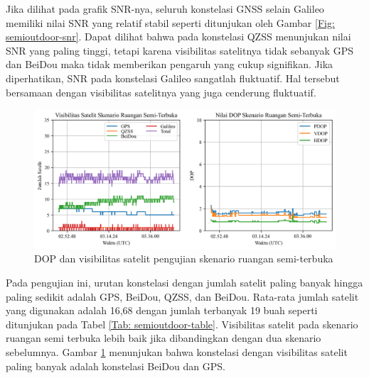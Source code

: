 Jika dilihat pada grafik SNR-nya, seluruh konstelasi GNSS selain Galileo memiliki nilai SNR yang relatif stabil seperti ditunjukan oleh Gambar \ref{Fig: semioutdoor-snr}. Dapat dilihat bahwa pada konstelasi QZSS menunjukan nilai SNR yang paling tinggi, tetapi karena visibilitas satelitnya tidak sebanyak GPS dan BeiDou maka tidak memberikan pengaruh yang cukup signifikan. Jika diperhatikan, SNR pada konstelasi Galileo sangatlah fluktuatif. Hal tersebut bersamaan dengan visibilitas satelitnya yang juga cenderung fluktuatif.

\begin{figure}[H]
	\centering
	\captionsetup{justification=centering}
	\begin{adjustbox}{width=\textwidth}
		\includegraphics{contents/chapter-4/3-skenario-semioutdoor/sats_dop.png}
	\end{adjustbox}
	\caption{DOP dan visibilitas satelit pengujian skenario ruangan semi-terbuka}
	\label{Fig: semioutdoor-sats_dop}
\end{figure}

Pada pengujian ini, urutan konstelasi dengan jumlah satelit paling banyak hingga paling sedikit adalah GPS, BeiDou, QZSS, dan BeiDou. Rata-rata jumlah satelit yang digunakan adalah 16,68 dengan jumlah terbanyak 19 buah seperti ditunjukan pada Tabel \ref{Tab: semioutdoor-table}. Visibilitas satelit pada skenario ruangan semi terbuka lebih baik jika dibandingkan dengan dua skenario sebelumnya. Gambar \ref{Fig: semioutdoor-sats_dop} menunjukan bahwa konstelasi dengan visibilitas satelit paling banyak adalah konstelasi BeiDou dan GPS.

